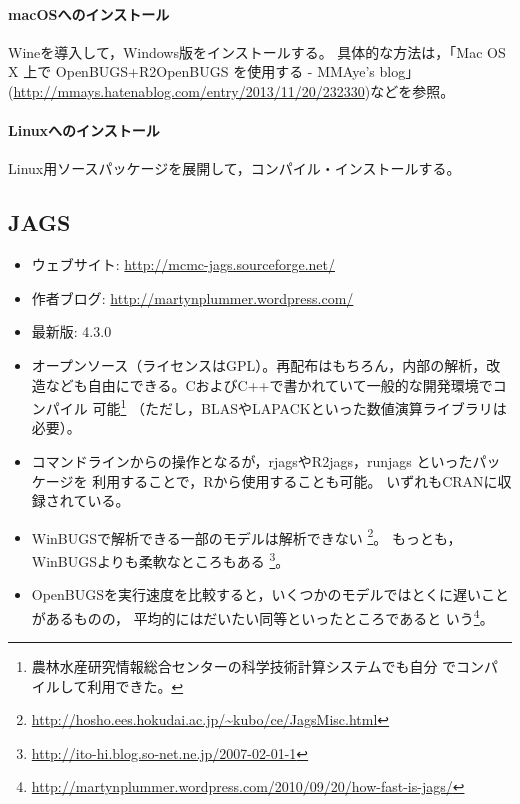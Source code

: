\documentclass[11pt,uplatex]{jsarticle}
\begin{document}
\paragraph{macOSへのインストール}
\textsf{Wine}を導入して，Windows版をインストールする。
具体的な方法は，「Mac OS X 上で OpenBUGS+R2OpenBUGS を使用する - MMAye's blog」(\url{http://mmays.hatenablog.com/entry/2013/11/20/232330})などを参照。

\paragraph{Linuxへのインストール}
Linux用ソースパッケージを展開して，コンパイル・インストールする。

\subsection{JAGS}

\begin{itemize}

\item ウェブサイト:
  \url{http://mcmc-jags.sourceforge.net/}
  
\item 作者ブログ:
  \url{http://martynplummer.wordpress.com/}  

\item 最新版: 4.3.0

\item オープンソース（ライセンスはGPL）。再配布はもちろん，内部の解析，改
  造なども自由にできる。CおよびC++で書かれていて一般的な開発環境でコンパイル
  可能\footnote{農林水産研究情報総合センターの科学技術計算システムでも自分
  でコンパイルして利用できた。}
  （ただし，BLASやLAPACKといった数値演算ライブラリは必要）。

\item コマンドラインからの操作となるが，\textsf{rjags}や\textsf{R2jags}，\textsf{runjags}
といったパッケージを
利用することで，\textsf{R}から使用することも可能。
いずれもCRANに収録されている。

\item \textsf{WinBUGS}で解析できる一部のモデルは解析できない
  \footnote{\url{http://hosho.ees.hokudai.ac.jp/~kubo/ce/JagsMisc.html}}。
 もっとも，\textsf{WinBUGS}よりも柔軟なところもある
  \footnote{\url{http://ito-hi.blog.so-net.ne.jp/2007-02-01-1}}。
  
\item \textsf{OpenBUGS}を実行速度を比較すると，いくつかのモデルではとくに遅いことがあるものの，
平均的にはだいたい同等といったところであると
いう\footnote{\url{http://martynplummer.wordpress.com/2010/09/20/how-fast-is-jags/}}。

\end{itemize}
\end{document}
